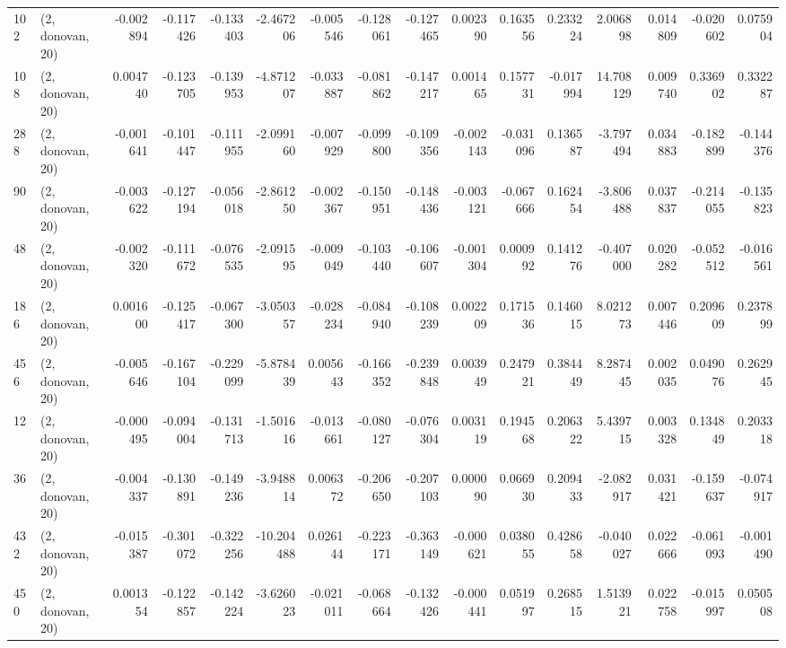 \begin{tabular}{llrrrrrrrrrrrrrr}
102 &  (2, donovan, 20) &  -0.002894 & -0.117426 & -0.133403 &   -2.467206 & -0.005546 &  -0.128061 & -0.127465 &  0.002390 &  0.163556 &  0.233224 &    2.006898 &  0.014809 & -0.020602 &  0.075904 \\
108 &  (2, donovan, 20) &   0.004740 & -0.123705 & -0.139953 &   -4.871207 & -0.033887 &  -0.081862 & -0.147217 &  0.001465 &  0.157731 & -0.017994 &   14.708129 &  0.009740 &  0.336902 &  0.332287 \\
288 &  (2, donovan, 20) &  -0.001641 & -0.101447 & -0.111955 &   -2.099160 & -0.007929 &  -0.099800 & -0.109356 & -0.002143 & -0.031096 &  0.136587 &   -3.797494 &  0.034883 & -0.182899 & -0.144376 \\
90  &  (2, donovan, 20) &  -0.003622 & -0.127194 & -0.056018 &   -2.861250 & -0.002367 &  -0.150951 & -0.148436 & -0.003121 & -0.067666 &  0.162454 &   -3.806488 &  0.037837 & -0.214055 & -0.135823 \\
48  &  (2, donovan, 20) &  -0.002320 & -0.111672 & -0.076535 &   -2.091595 & -0.009049 &  -0.103440 & -0.106607 & -0.001304 &  0.000992 &  0.141276 &   -0.407000 &  0.020282 & -0.052512 & -0.016561 \\
186 &  (2, donovan, 20) &   0.001600 & -0.125417 & -0.067300 &   -3.050357 & -0.028234 &  -0.084940 & -0.108239 &  0.002209 &  0.171536 &  0.146015 &    8.021273 &  0.007446 &  0.209609 &  0.237899 \\
456 &  (2, donovan, 20) &  -0.005646 & -0.167104 & -0.229099 &   -5.878439 &  0.005643 &  -0.166352 & -0.239848 &  0.003949 &  0.247921 &  0.384449 &    8.287445 &  0.002035 &  0.049076 &  0.262945 \\
12  &  (2, donovan, 20) &  -0.000495 & -0.094004 & -0.131713 &   -1.501616 & -0.013661 &  -0.080127 & -0.076304 &  0.003119 &  0.194568 &  0.206322 &    5.439715 &  0.003328 &  0.134849 &  0.203318 \\
36  &  (2, donovan, 20) &  -0.004337 & -0.130891 & -0.149236 &   -3.948814 &  0.006372 &  -0.206650 & -0.207103 &  0.000090 &  0.066930 &  0.209433 &   -2.082917 &  0.031421 & -0.159637 & -0.074917 \\
432 &  (2, donovan, 20) &  -0.015387 & -0.301072 & -0.322256 &  -10.204488 &  0.026144 &  -0.223171 & -0.363149 & -0.000621 &  0.038055 &  0.428658 &   -0.040027 &  0.022666 & -0.061093 & -0.001490 \\
450 &  (2, donovan, 20) &   0.001354 & -0.122857 & -0.142224 &   -3.626023 & -0.021011 &  -0.068664 & -0.132426 & -0.000441 &  0.051997 &  0.268515 &    1.513921 &  0.022758 & -0.015997 &  0.050508 \\

\end{tabular}
